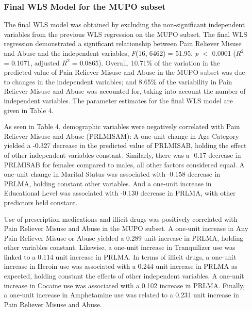 \documentclass[sigconf]{acmart}
\begin{document}

\subsubsection{Final WLS Model for the MUPO subset}

The final WLS model was obtained by excluding the non-significant independent 
variables from the previous WLS regression on the MUPO subset. The final WLS 
regression demonstrated a significant relationship between Pain Reliever Misuse 
and Abuse and the independent variables, \textit{F}(16, 6462) = 51.95, 
\textit{p} $<$ 0.0001 ($R^2$ = 0.1071, adjusted $R^2$ = 0.0865). Overall, 
10.71\% of the variation in the predicted value of Pain Reliever Misuse and 
Abuse in the MUPO subset was due to changes in the independent variables; 
and 8.65\% of the variability in Pain Reliever Misuse and Abuse was accounted 
for, taking into account the number of independent variables. The parameter 
estimates for the final WLS model are given in Table 4. 

As seen in Table 4, demographic variables were negatively correlated with Pain 
Reliever Misuse and Abuse (PRLMISAM): A one-unit change in Age Category yielded a 
-0.327 decrease in the predicted value of PRLMISAB, holding the effect of other 
independent variables constant. Similarly, there was a -0.17 decrease in PRLMISAB 
for females compared to males, all other factors considered equal. A one-unit 
change in Marital Status was associated with -0.158 decrease in PRLMA, holding
constant other variables. And a one-unit increase in Educational Level was 
associated with -0.130 decrease in PRLMA, with other predictors held constant. 

Use of prescription medications and illicit drugs was positively correlated with 
Pain Reliever Misuse and Abuse in the MUPO subset. A one-unit increase in Any 
Pain Reliever Misuse or Abuse yielded a 0.289 unit increase in PRLMA, holding 
other variables constant. Likewise, a one-unit increase in Tranquilizer use was 
linked to a 0.114 unit increase in PRLMA. In terms of illicit drugs, a one-unit 
increase in Heroin use was associated with a 0.244 unit increase in PRLMA as 
expected, holding constant the effects of other independent variables. 
A one-unit increase in Cocaine use was associated with a 0.102 increase in PRLMA. 
Finally, a one-unit increase in Amphetamine use was related to a 0.231 unit 
increase in Pain Reliever Misuse and Abuse.  
\end{document}
